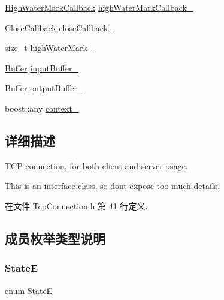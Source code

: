 \begin{DoxyCompactItemize}
\hyperlink{namespacemuduo_1_1net_a503c5e91d2e84874e83e9a6cbfb4a47b}{High\+Water\+Mark\+Callback} \hyperlink{classmuduo_1_1net_1_1TcpConnection_a70760fcf5021313fa48be2025b751d46}{high\+Water\+Mark\+Callback\+\_\+}
\item 
\hyperlink{namespacemuduo_1_1net_a5a393be65a093bad5f5a6b8340ce8c88}{Close\+Callback} \hyperlink{classmuduo_1_1net_1_1TcpConnection_af4ea87dce1e6aaa022507ff52bc7360b}{close\+Callback\+\_\+}
\item 
size\+\_\+t \hyperlink{classmuduo_1_1net_1_1TcpConnection_ae83db1125e4affc6e1002849c7a56968}{high\+Water\+Mark\+\_\+}
\item 
\hyperlink{classmuduo_1_1net_1_1Buffer}{Buffer} \hyperlink{classmuduo_1_1net_1_1TcpConnection_a5466c35e5bfc020933095af435e30c80}{input\+Buffer\+\_\+}
\item 
\hyperlink{classmuduo_1_1net_1_1Buffer}{Buffer} \hyperlink{classmuduo_1_1net_1_1TcpConnection_a0de4fbd6e5608f695dd0b9f02897f297}{output\+Buffer\+\_\+}
\item 
boost\+::any \hyperlink{classmuduo_1_1net_1_1TcpConnection_a71712b023252fc8c769607fc03cce727}{context\+\_\+}
\end{DoxyCompactItemize}


\subsection{详细描述}
T\+CP connection, for both client and server usage.

This is an interface class, so don\textquotesingle{}t expose too much details. 

在文件 Tcp\+Connection.\+h 第 41 行定义.



\subsection{成员枚举类型说明}
\mbox{\label{classmuduo_1_1net_1_1TcpConnection_a8cf72f776f4277c8138a1beaf5185325}} 
\subsubsection{\texorpdfstring{StateE}{StateE}}
{\footnotesize\ttfamily enum \hyperlink{classmuduo_1_1net_1_1TcpConnection_a8cf72f776f4277c8138a1beaf5185325}{StateE}\hspace{0.3cm}{\ttfamily [private]}}

